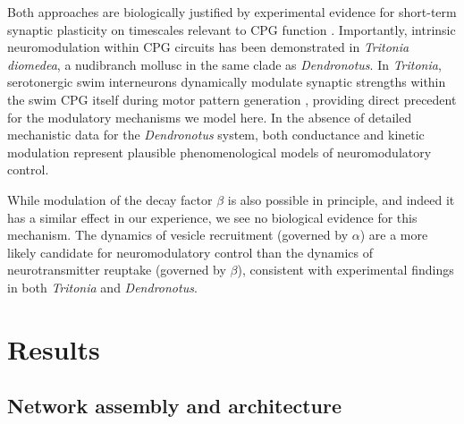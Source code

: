 \documentclass[nofootinbib,aip,amsmath,amssymb,preprint,twocolumn,floatfix,10pt]{revtex4-2}
\begin{document}
Both approaches are biologically justified by experimental evidence for short-term synaptic plasticity on timescales relevant to CPG function \cite{zucker2002short, jackman2017mechanisms}. Importantly, intrinsic neuromodulation within CPG circuits has been demonstrated in \textit{Tritonia diomedea}, a nudibranch mollusc in the same clade as \textit{Dendronotus}. In \textit{Tritonia}, serotonergic swim interneurons dynamically modulate synaptic strengths within the swim CPG itself during motor pattern generation \cite{katz1994dynamic, sakurai2003spike}, providing direct precedent for the modulatory mechanisms we model here. In the absence of detailed mechanistic data for the \textit{Dendronotus} system, both conductance and kinetic modulation represent plausible phenomenological models of neuromodulatory control. 

While modulation of the decay factor $\beta$ is also possible in principle, and indeed it has a similar effect in our experience, we see no biological evidence for this mechanism. The dynamics of vesicle recruitment (governed by $\alpha$) are a more likely candidate for neuromodulatory control than the dynamics of neurotransmitter reuptake (governed by $\beta$), consistent with experimental findings in both \textit{Tritonia} and \textit{Dendronotus}.

\section{Results}

\subsection{Network assembly and architecture}
\end{document}
